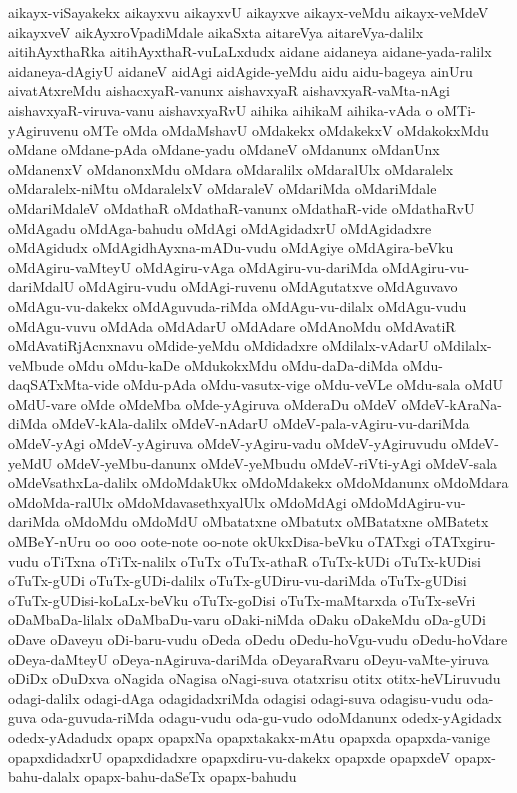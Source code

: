 {aikayx-viSayakekx
aikayxvu
aikayxvU
aikayxve
aikayx-veMdu
aikayx-veMdeV
aikayxveV
aikAyxroVpadiMdale
aikaSxta
aitareVya
aitareVya-dalilx
aitihAyxthaRka
aitihAyxthaR-vuLaLxdudx
aidane
aidaneya
aidane-yada-ralilx
aidaneya-dAgiyU
aidaneV
aidAgi
aidAgide-yeMdu
aidu
aidu-bageya
ainUru
aivatAtxreMdu
aishacxyaR-vanunx
aishavxyaR
aishavxyaR-vaMta-nAgi
aishavxyaR-viruva-vanu
aishavxyaRvU
aihika
aihikaM
aihika-vAda
o
oMTi-yAgiruvenu
oMTe
oMda
oMdaMshavU
oMdakekx
oMdakekxV
oMdakokxMdu
oMdane
oMdane-pAda
oMdane-yadu
oMdaneV
oMdanunx
oMdanUnx
oMdanenxV
oMdanonxMdu
oMdara
oMdaralilx
oMdaralUlx
oMdaralelx
oMdaralelx-niMtu
oMdaralelxV
oMdaraleV
oMdariMda
oMdariMdale
oMdariMdaleV
oMdathaR
oMdathaR-vanunx
oMdathaR-vide
oMdathaRvU
oMdAgadu
oMdAga-bahudu
oMdAgi
oMdAgidadxrU
oMdAgidadxre
oMdAgidudx
oMdAgidhAyxna-mADu-vudu
oMdAgiye
oMdAgira-beVku
oMdAgiru-vaMteyU
oMdAgiru-vAga
oMdAgiru-vu-dariMda
oMdAgiru-vu-dariMdalU
oMdAgiru-vudu
oMdAgi-ruvenu
oMdAgutatxve
oMdAguvavo
oMdAgu-vu-dakekx
oMdAguvuda-riMda
oMdAgu-vu-dilalx
oMdAgu-vudu
oMdAgu-vuvu
oMdAda
oMdAdarU
oMdAdare
oMdAnoMdu
oMdAvatiR
oMdAvatiRjAcnxnavu
oMdide-yeMdu
oMdidadxre
oMdilalx-vAdarU
oMdilalx-veMbude
oMdu
oMdu-kaDe
oMdukokxMdu
oMdu-daDa-diMda
oMdu-daqSATxMta-vide
oMdu-pAda
oMdu-vasutx-vige
oMdu-veVLe
oMdu-sala
oMdU
oMdU-vare
oMde
oMdeMba
oMde-yAgiruva
oMderaDu
oMdeV
oMdeV-kAraNa-diMda
oMdeV-kAla-dalilx
oMdeV-nAdarU
oMdeV-pala-vAgiru-vu-dariMda
oMdeV-yAgi
oMdeV-yAgiruva
oMdeV-yAgiru-vadu
oMdeV-yAgiruvudu
oMdeV-yeMdU
oMdeV-yeMbu-danunx
oMdeV-yeMbudu
oMdeV-riVti-yAgi
oMdeV-sala
oMdeVsathxLa-dalilx
oMdoMdakUkx
oMdoMdakekx
oMdoMdanunx
oMdoMdara
oMdoMda-ralUlx
oMdoMdavasethxyalUlx
oMdoMdAgi
oMdoMdAgiru-vu-dariMda
oMdoMdu
oMdoMdU
oMbatatxne
oMbatutx
oMBatatxne
oMBatetx
oMBeY-nUru
oo
ooo
oote-note
oo-note
okUkxDisa-beVku
oTATxgi
oTATxgiru-vudu
oTiTxna
oTiTx-nalilx
oTuTx
oTuTx-athaR
oTuTx-kUDi
oTuTx-kUDisi
oTuTx-gUDi
oTuTx-gUDi-dalilx
oTuTx-gUDiru-vu-dariMda
oTuTx-gUDisi
oTuTx-gUDisi-koLaLx-beVku
oTuTx-goDisi
oTuTx-maMtarxda
oTuTx-seVri
oDaMbaDa-lilalx
oDaMbaDu-varu
oDaki-niMda
oDaku
oDakeMdu
oDa-gUDi
oDave
oDaveyu
oDi-baru-vudu
oDeda
oDedu
oDedu-hoVgu-vudu
oDedu-hoVdare
oDeya-daMteyU
oDeya-nAgiruva-dariMda
oDeyaraRvaru
oDeyu-vaMte-yiruva
oDiDx
oDuDxva
oNagida
oNagisa
oNagi-suva
otatxrisu
otitx
otitx-heVLiruvudu
odagi-dalilx
odagi-dAga
odagidadxriMda
odagisi
odagi-suva
odagisu-vudu
oda-guva
oda-guvuda-riMda
odagu-vudu
oda-gu-vudo
odoMdanunx
odedx-yAgidadx
odedx-yAdadudx
opapx
opapxNa
opapxtakakx-mAtu
opapxda
opapxda-vanige
opapxdidadxrU
opapxdidadxre
opapxdiru-vu-dakekx
opapxde
opapxdeV
opapx-bahu-dalalx
opapx-bahu-daSeTx
opapx-bahudu
}
